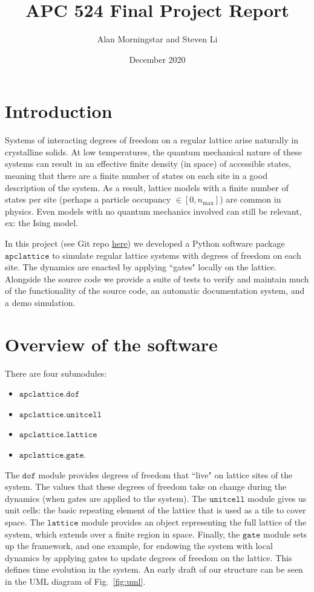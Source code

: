 \documentclass{article}
\title{APC 524 Final Project Report}
\author{Alan Morningstar and Steven Li}
\date{December 2020}
\begin{document}
\maketitle

\section{Introduction}

Systems of interacting degrees of freedom on a regular lattice arise naturally in crystalline solids. At low temperatures, the quantum mechanical nature of these systems can result in an effective finite density (in space) of accessible states, meaning that there are a finite number of states on each site in a good description of the system. As a result, lattice models with a finite number of states per site (perhaps a particle occupancy $\in [0, n_\mathrm{max}]$) are common in physics. Even models with no quantum mechanics involved can still be relevant, ex: the Ising model.

In this project (see Git repo \href{http://www.github.com/aormorningstar/apclattice}{here}) we developed a Python software package $\texttt{apclattice}$ to simulate regular lattice systems with degrees of freedom on each site. The dynamics are enacted by applying ``gates" locally on the lattice. Alongside the source code we provide a suite of tests to verify and maintain much of the functionality of the source code, an automatic documentation system, and a demo simulation.

\section{Overview of the software}
There are four submodules:

\begin{itemize}
    \item $\texttt{apclattice.dof}$
    \item $\texttt{apclattice.unitcell}$
    \item $\texttt{apclattice.lattice}$
    \item $\texttt{apclattice.gate}$.
\end{itemize}

The $\texttt{dof}$ module provides degrees of freedom that ``live" on lattice sites of the system. The values that these degrees of freedom take on change during the dynamics (when gates are applied to the system). The $\texttt{unitcell}$ module gives us unit cells: the basic repeating element of the lattice that is used as a tile to cover space. The $\texttt{lattice}$ module provides an object representing the full lattice of the system, which extends over a finite region in space. Finally, the $\texttt{gate}$ module sets up the framework, and one example, for endowing the system with local dynamics by applying gates to update degrees of freedom on the lattice. This defines time evolution in the system.  An early draft of our structure can be seen in the UML diagram of Fig.~\ref{fig:uml}.
\end{document}
